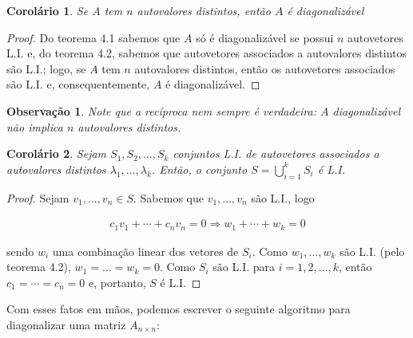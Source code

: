 \documentclass{article}
\newtheorem{corollary}{Corolário}[theorem]
\newtheorem*{remark}{Observação}
\begin{document}
\begin{corollary}
	Se $A$ tem $n$ autovalores distintos, então $A$ é diagonalizável
\end{corollary}

\begin{proof}
	Do teorema 4.1 sabemos que $A$ só é diagonalizável se possui $n$ autovetores L.I. e, do teorema 4.2, sabemos que autovetores associados a autovalores distintos são L.I.; logo, se $A$ tem $n$ autovalores distintos, então os autovetores associados são L.I. e, consequentemente, $A$ é diagonalizável.
\end{proof}

\begin{remark}
	Note que a recíproca nem sempre é verdadeira: $A$ diagonalizável não implica $n$ autovalores distintos.
\end{remark}

\begin{corollary}
	Sejam $S_1, S_2, \dots, S_k$ conjuntos L.I. de autovetores associados a autovalores distintos $\lambda_1, \dots, \lambda_k$. Então, o conjunto $\displaystyle{S = \bigcup_{i=1}^{k}S_i  }$ é L.I.
\end{corollary}

\begin{proof}
	Sejam $v_1, \dots, v_n\in S$. Sabemos que $v_1, \dots, v_n$ são L.I., logo
	
	\begin{align*}
	c_1v_1 + \cdots + c_nv_n = 0 \Rightarrow w_1 + \cdots + w_k = 0
	\end{align*}
	
	\par\vspace{0.3cm} sendo $w_i$ uma combinação linear dos vetores de $S_i$. Como $w_1, \dots, w_k$ são L.I. (pelo teorema 4.2), $w_1 = \dots = w_k = 0$. Como $S_i$ são L.I. para $i = 1, 2, \dots, k$, então $c_1 = \cdots = c_n = 0$ e, portanto, $S$ é L.I.
	
\end{proof}

\par\vspace{0.3cm} Com esses fatos em mãos, podemos escrever o seguinte algoritmo para diagonalizar uma matriz $A_{n\times n}$:
\end{document}
